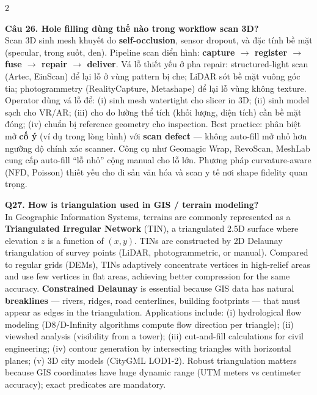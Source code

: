 \begin{paracol}{2}
\switchcolumn

\textbf{Câu 26. Hole filling dùng thế nào trong workflow scan 3D?}\\
Scan 3D sinh mesh khuyết do \textbf{self-occlusion}, sensor dropout, và đặc tính bề mặt (specular, trong suốt, đen). Pipeline scan điển hình: \textbf{capture $\to$ register $\to$ fuse $\to$ repair $\to$ deliver}. Vá lỗ thiết yếu ở pha repair: structured-light scan (Artec, EinScan) để lại lỗ ở vùng pattern bị che; LiDAR sót bề mặt vuông góc tia; photogrammetry (RealityCapture, Metashape) để lại lỗ vùng không texture. Operator dùng vá lỗ để: (i) sinh mesh watertight cho slicer in 3D; (ii) sinh model sạch cho VR/AR; (iii) cho đo lường thể tích (khối lượng, diện tích) cần bề mặt đóng; (iv) chuẩn bị reference geometry cho inspection. Best practice: phân biệt mở \textbf{cố ý} (ví dụ trong lòng bình) với \textbf{scan defect} — không auto-fill mở nhỏ hơn ngưỡng độ chính xác scanner. Công cụ như Geomagic Wrap, RevoScan, MeshLab cung cấp auto-fill ``lỗ nhỏ'' cộng manual cho lỗ lớn. Phương pháp curvature-aware (NFD, Poisson) thiết yếu cho di sản văn hóa và scan y tế nơi shape fidelity quan trọng.

\switchcolumn*

\textbf{Q27. How is triangulation used in GIS / terrain modeling?}\\
In Geographic Information Systems, terrains are commonly represented as a \textbf{Triangulated Irregular Network} (TIN), a triangulated 2.5D surface where elevation $z$ is a function of $(x,y)$. TINs are constructed by 2D Delaunay triangulation of survey points (LiDAR, photogrammetric, or manual). Compared to regular grids (DEMs), TINs adaptively concentrate vertices in high-relief areas and use few vertices in flat areas, achieving better compression for the same accuracy. \textbf{Constrained Delaunay} is essential because GIS data has natural \textbf{breaklines} — rivers, ridges, road centerlines, building footprints — that must appear as edges in the triangulation. Applications include: (i) hydrological flow modeling (D8/D-Infinity algorithms compute flow direction per triangle); (ii) viewshed analysis (visibility from a tower); (iii) cut-and-fill calculations for civil engineering; (iv) contour generation by intersecting triangles with horizontal planes; (v) 3D city models (CityGML LOD1-2). Robust triangulation matters because GIS coordinates have huge dynamic range (UTM meters vs centimeter accuracy); exact predicates are mandatory.

\switchcolumn


\end{paracol}
